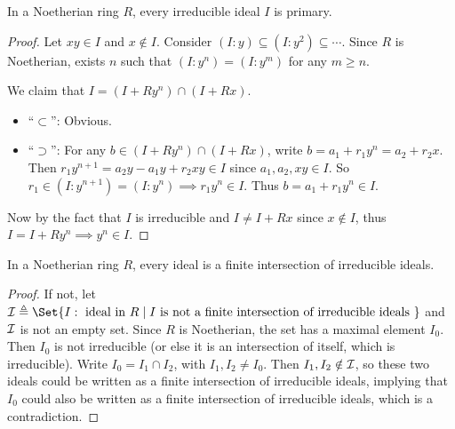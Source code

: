\begin{theorem} \label{thm:noeth-irr-ideal-is-primary}
  In a Noetherian ring $R$, every irreducible ideal $I$ is primary.

  \begin{proof}
    Let $xy \in I$ and $x \notin I$. Consider $(I : y) \subseteq (I: y^2) \subseteq \dotsm$.
    Since $R$ is Noetherian, exists $n$ such that $(I: y^n) = (I: y^m)$ for any $m \geq n$.

    We claim that $I = (I + Ry^n) \cap (I + Rx)$.
    \begin{itemize}
      \item ``$\subset$'': Obvious.
      \item ``$\supset$'': For any $b \in (I + Ry^n) \cap (I + Rx)$,
        write $b = a_1 + r_1 y^{n} = a_2 + r_2 x$. Then
        $r_1 y^{n+1} = a_2 y - a_1 y + r_2 x y \in I$ since $a_1, a_2, xy \in I$.
        So $r_1 \in (I: y^{n+1}) = (I: y^n) \implies r_1 y^n \in I$.
        Thus $b = a_1 + r_1 y^n \in I$.
    \end{itemize}

    Now by the fact that $I$ is irreducible and $I \neq I + Rx$ since $x \notin I$,
    thus $I = I + Ry^n \implies y^n \in I$.
  \end{proof}
\end{theorem}

\begin{theorem} \label{thm:noeth-ideal-is-finite-intersection}
  In a Noetherian ring $R$, every ideal is a finite intersection of irreducible ideals.

  \begin{proof}
    If not, let $\Ic \triangleq \Set{I: \text{ ideal in } R \mid I \text{ is not a finite intersection
        of irreducible ideals }}$ and $\mathcal{I}$ is not an empty set.
    Since $R$ is Noetherian, the set has a maximal element $I_0$. Then $I_0$ is not
    irreducible (or else it is an intersection of itself, which is irreducible).
    Write $I_0 = I_1 \cap I_2$, with $I_1, I_2 \neq I_0$. Then $I_1, I_2 \notin \mathcal{I}$,
    so these two ideals could be written as a finite intersection of irreducible ideals,
    implying that $I_0$ could also be written as a finite intersection of irreducible ideals,
    which is a contradiction.
  \end{proof}
\end{theorem}

